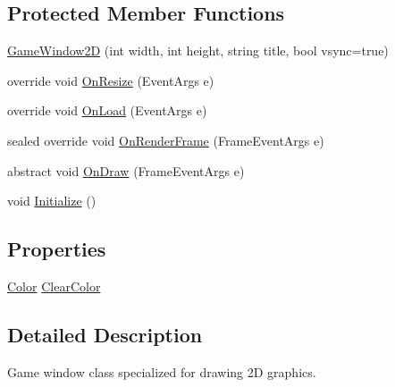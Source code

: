 \subsection*{Protected Member Functions}
\begin{DoxyCompactItemize}
\item 
\hyperlink{class_tri_devs_1_1_tri_engine2_d_1_1_game_window2_d_ab7d788fd5b792584a2c27db9da82ec76}{Game\-Window2\-D} (int width, int height, string title, bool vsync=true)
\item 
override void \hyperlink{class_tri_devs_1_1_tri_engine2_d_1_1_game_window2_d_a0bdb065bfc10d4cff8e1098c03ece809}{On\-Resize} (Event\-Args e)
\item 
override void \hyperlink{class_tri_devs_1_1_tri_engine2_d_1_1_game_window2_d_ae1e61b87586963253506e11f22b5eb17}{On\-Load} (Event\-Args e)
\item 
sealed override void \hyperlink{class_tri_devs_1_1_tri_engine2_d_1_1_game_window2_d_a35d70be9b4ec0b954c3aba906082b646}{On\-Render\-Frame} (Frame\-Event\-Args e)
\item 
abstract void \hyperlink{class_tri_devs_1_1_tri_engine2_d_1_1_game_window2_d_a8a06f4d94a089e61629e35180776e77f}{On\-Draw} (Frame\-Event\-Args e)
\item 
void \hyperlink{class_tri_devs_1_1_tri_engine2_d_1_1_game_window2_d_a477cbe1722190a184c0031bc71534d7a}{Initialize} ()
\end{DoxyCompactItemize}
\subsection*{Properties}
\begin{DoxyCompactItemize}
\item 
\hyperlink{struct_tri_devs_1_1_tri_engine2_d_1_1_color}{Color} \hyperlink{class_tri_devs_1_1_tri_engine2_d_1_1_game_window2_d_a9294fb4c57b9860db106801f8eb5fa0d}{Clear\-Color}
\end{DoxyCompactItemize}


\subsection{Detailed Description}
Game window class specialized for drawing 2\-D graphics. 



